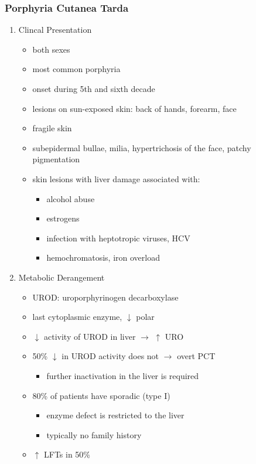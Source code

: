 \documentclass{scrartcl}
\begin{document}
\subsubsection{Porphyria Cutanea Tarda}
\label{sec:org66f260e}
\begin{enumerate}
\item Clincal Presentation
\label{sec:org660b208}
\begin{itemize}
\item both sexes
\item most common porphyria
\item onset during 5th and sixth decade
\item lesions on sun-exposed skin: back of hands, forearm, face
\item fragile skin
\item subepidermal bullae, milia, hypertrichosis of the face, patchy pigmentation
\item skin lesions with liver damage associated with:
\begin{itemize}
\item alcohol abuse
\item estrogens
\item infection with heptotropic viruses, HCV
\item hemochromatosis, iron overload
\end{itemize}
\end{itemize}
\item Metabolic Derangement
\label{sec:org5081945}
\begin{itemize}
\item UROD: uroporphyrinogen decarboxylase
\item last cytoplasmic enzyme, \(\downarrow\) polar
\item \(\downarrow\) activity of UROD in liver \(\to\) \(\uparrow\) URO
\item 50\% \(\downarrow\) in UROD activity does not \(\to\) overt PCT
\begin{itemize}
\item further inactivation in the liver is required
\end{itemize}
\item 80\% of patients have sporadic (type I)
\begin{itemize}
\item enzyme defect is restricted to the liver
\item typically no family history
\end{itemize}
\item \(\uparrow\) LFTs in 50\%

\end{itemize}
\end{enumerate}
\end{document}

